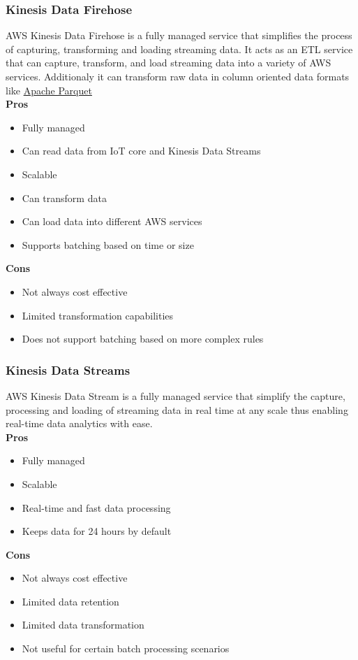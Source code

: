         \subsubsection{Kinesis Data Firehose}
        \label{aws:kinesis-data-firehose}
        AWS Kinesis Data Firehose is a fully managed service that simplifies the process of capturing, transforming and loading streaming data.
        It acts as an ETL service that can capture, transform, and load streaming data into a variety of AWS services.
        Additionaly it can transform raw data in column oriented data formats like \href{https://parquet.apache.org/}{Apache Parquet}\\
        \textbf{Pros}
        \begin{itemize}
            \item Fully managed
            \item Can read data from IoT core and Kinesis Data Streams
            \item Scalable
            \item Can transform data
            \item Can load data into different AWS services
            \item Supports batching based on time or size
        \end{itemize}
        \textbf{Cons}
        \begin{itemize}
            \item Not always cost effective
            \item Limited transformation capabilities
            \item Does not support batching based on more complex rules
        \end{itemize}
        
        \subsubsection{Kinesis Data Streams} 
        \label{aws:kinesis-data-streams}
        AWS Kinesis Data Stream is a fully managed service that simplify the capture,
         processing and loading of streaming data in real time at any scale thus enabling real-time data analytics with ease.\\
        \textbf{Pros}
        \begin{itemize}
            \item Fully managed
            \item Scalable
            \item Real-time and fast data processing
            \item Keeps data for 24 hours by default
        \end{itemize}
        \textbf{Cons}
        \begin{itemize}
            \item Not always cost effective
            \item Limited data retention
            \item Limited data transformation
            \item Not useful for certain batch processing scenarios
        \end{itemize}

